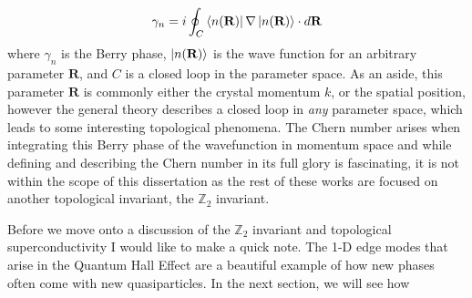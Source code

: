 \begin{align}
	\gamma_{n} = i\oint_{C}\bra{n(\textbf{R})}\nabla\ket{n(\textbf{R})}\cdot d\textbf{R}
\end{align}
where $\gamma_{n}$ is the Berry phase, $\ket{n(\textbf{R})}$ is the wave function for an arbitrary parameter $\textbf{R}$, and $C$ is a closed loop in the parameter space. As an aside, this parameter $\textbf{R}$ is commonly either the crystal momentum $k$, or the spatial position, however the general theory describes a closed loop in \textit{any} parameter space, which leads to some interesting topological phenomena\cite{Onoda2002,Gobel2019}. The Chern number arises when integrating this Berry phase of the wavefunction in momentum space and while defining and describing the Chern number in its full glory is fascinating, it is not within the scope of this dissertation as the rest of these works are focused on another topological invariant, the $\mathbb{Z}_{2}$ invariant.\par 
Before we move onto a discussion of the $\mathbb{Z}_{2}$ invariant and topological superconductivity I would like to make a quick note. The 1-D edge modes that arise in the Quantum Hall Effect are a beautiful example of how new phases often come with new quasiparticles. In the next section, we will see how 
